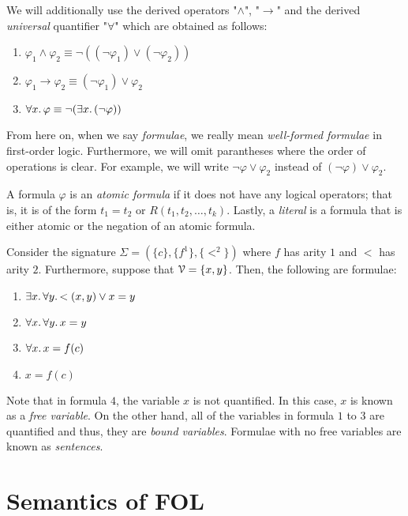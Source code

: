 \documentclass[11pt,usenames, dvipsnames]{article}
\begin{document}
We will additionally use the derived operators "$\wedge$", "$\rightarrow$" and the derived \emph{universal} quantifier "$\forall$" which are obtained as follows:
\begin{enumerate}
  \item $\varphi_1 \wedge \varphi_2 \equiv \neg((\neg \varphi_1) \vee (\neg \varphi_2))$
  \item $\varphi_1 \rightarrow \varphi_2 \equiv (\neg \varphi_1) \vee \varphi_2$
  \item $\forall x \ldotp \varphi \equiv \neg(\exists x \ldotp (\neg \varphi))$
\end{enumerate}

From here on, when we say \emph{formulae}, we really mean \emph{well-formed formulae} in first-order logic. Furthermore, we will omit parantheses where the order of operations is clear. For example, we will write $\neg \varphi \vee \varphi_2$ instead of $(\neg \varphi) \vee \varphi_2$.

A formula $\varphi$ is an \emph{atomic formula} if it does not have any logical operators; that is, it is of the form $t_1 = t_2$ or $R(t_1, t_2, \ldots, t_k)$. Lastly, a \emph{literal} is a formula that is either atomic or the negation of an atomic formula.

\begin{example}
  Consider the signature $\Sigma = (\{c\}, \{f^1\}, \{<^2\})$ where $f$ has arity $1$ and $<$ has arity $2$. Furthermore, suppose that $\vars = \{x, y\}$. Then, the following are formulae:
  \begin{enumerate}
    \item $\exists x \ldotp \forall y \ldotp <(x, y) \vee x = y$
    \item $\forall x \ldotp \forall y \ldotp x = y$
    \item $\forall x \ldotp x = f(c)$
    \item $x = f(c)$
  \end{enumerate}
\end{example}

Note that in formula $4$, the variable $x$ is not quantified. In this case, $x$ is known as a \emph{free variable}. On the other hand, all of the variables in formula $1$ to $3$ are quantified and thus, they are \emph{bound variables}. Formulae with no free variables are known as \emph{sentences}.

\section*{\large \centering Semantics of FOL}
\noindent
\end{document}
